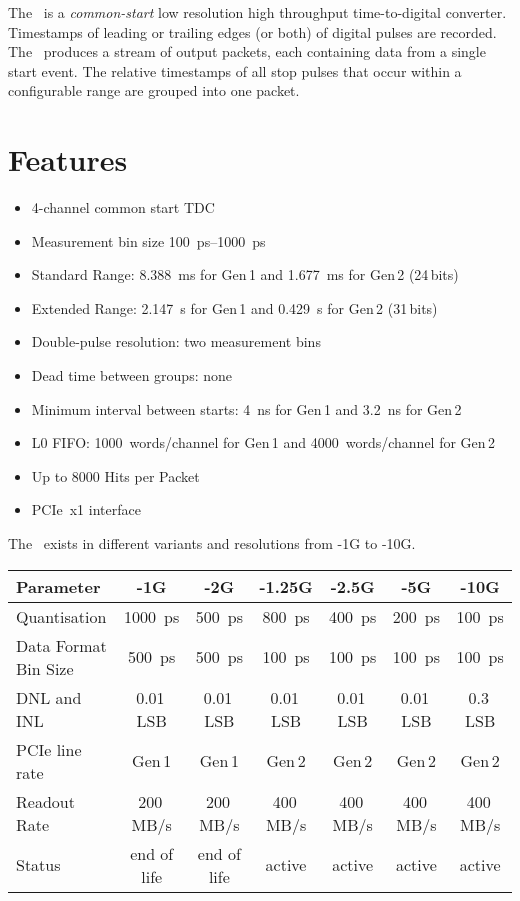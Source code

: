 The \deviceName\ is a \emph{common-start} low resolution high throughput time-to-digital converter. 
Timestamps of leading or trailing edges (or both) of digital pulses are recorded. 
The \deviceName\ produces a stream of output packets, each containing data from a single start event. 
The relative timestamps of all stop pulses that occur within a configurable range are grouped into one packet.

\section{Features} \label{sec:features}
	\begin{itemize}
		\item 4-channel common start TDC
		\item Measurement bin size \SIrange{100}{1000}{\pico\second}
		\item Standard Range: \SI{8.388}{\milli\second} for Gen\,1 and \SI{1.677}{\milli\second} for Gen\,2 (24\,bits)
		\item Extended Range: \SI{2.147}{\second} for Gen\,1 and \SI{0.429}{\second} for Gen\,2 (31\,bits)
		\item Double-pulse resolution: two measurement bins 
		\item Dead time between groups: none
		\item Minimum interval between starts: \SI{4}{\nano\second} for Gen\,1 and \SI{3.2}{\nano\second} for Gen\,2
		\item L0 FIFO: 1000~words/channel for Gen\,1 and 4000~words/channel for Gen\,2
		\item Up to 8000 Hits per Packet
		\item PCIe~x1 interface
	\end{itemize} 

	The \deviceName\ exists in different variants and resolutions from \deviceName-1G to \deviceName-10G.  

	\noindent
	\begin{tabularx}{\textwidth}{|X|c|c|c|c|c|c|}
		\hline
		Parameter & -1G & -2G & -1.25G & -2.5G & -5G & -10G\\
		\hline\hline
		Quantisation & \SI{1000}{\pico\second} & \SI{500}{\pico\second} & \SI{800}{\pico\second} & \SI{400}{\pico\second} & \SI{200}{\pico\second} & \SI{100}{\pico\second} \\
		\hline
		Data Format Bin Size & \SI{500}{\pico\second} & \SI{500}{\pico\second} & \SI{100}{\pico\second} & \SI{100}{\pico\second} & \SI{100}{\pico\second} & \SI{100}{\pico\second} \\
		\hline 
		DNL and INL & 0.01\,LSB & 0.01\,LSB & 0.01\,LSB & 0.01\,LSB & 0.01\,LSB & 0.3\,LSB \\
		\hline 
		PCIe line rate & Gen\,1 & Gen\,1 & Gen\,2 & Gen\,2 & Gen\,2 & Gen\,2\\  
		\hline 
		Readout Rate & 200\,MB/s & 200\,MB/s & 400\,MB/s & 400\,MB/s & 400\,MB/s & 400\,MB/s\\ 
		\hline 
		Status & end of life & end of life & active & active & active & active \\
		\hline
   \end{tabularx}  

